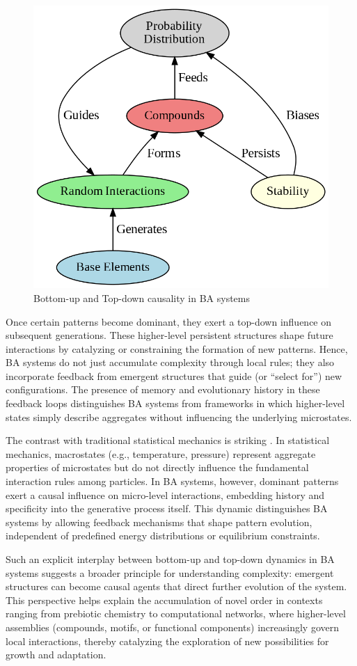 \documentclass[entropy,article,submit,pdftex,moreauthors]{Definitions/mdpi}
\begin{document}
\begin{figure}[h]
    \centering
    \includegraphics[width=0.7\linewidth,height=0.7\linewidth]{images/ba_topdown.png}
    \caption{Bottom-up and Top-down causality in BA systems}
    \label{fig:ba_topdown}
\end{figure}

Once certain patterns become dominant, they exert a top-down influence on subsequent generations. These higher-level persistent structures shape future interactions by catalyzing or constraining the formation of new patterns. Hence, BA systems do not just accumulate complexity through local rules; they also incorporate feedback from emergent structures that guide (or ``select for'') new configurations. The presence of memory and evolutionary history in these feedback loops distinguishes BA systems from frameworks in which higher-level states simply describe aggregates without influencing the underlying microstates.

The contrast with traditional statistical mechanics is striking \cite{landau1980statistical}. In statistical mechanics, macrostates (e.g., temperature, pressure) represent aggregate properties of microstates but do not directly influence the fundamental interaction rules among particles. In BA systems, however, dominant patterns exert a causal influence on micro-level interactions, embedding history and specificity into the generative process itself. This dynamic distinguishes BA systems by allowing feedback mechanisms that shape pattern evolution, independent of predefined energy distributions or equilibrium constraints.

Such an explicit interplay between bottom-up and top-down dynamics in BA systems suggests a broader principle for understanding complexity: emergent structures can become causal agents that direct further evolution of the system. This perspective helps explain the accumulation of novel order in contexts ranging from prebiotic chemistry to computational networks, where higher-level assemblies (compounds, motifs, or functional components) increasingly govern local interactions, thereby catalyzing the exploration of new possibilities for growth and adaptation.
\end{document}
